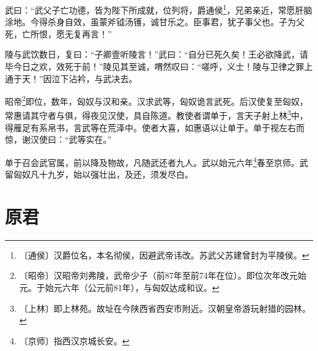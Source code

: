 \documentclass[12pt,UTF-8,openany]{ctexbook}
\begin{document}
\begin{normalsize}
    武曰：“武父子亡功德，皆为陛下所成就，位列将，爵通侯\footnote{〔通侯〕汉爵位名，本名彻侯，因避武帝讳改。苏武父苏建曾封为平陵侯。}，兄弟亲近，常愿肝脑涂地。今得杀身自效，虽蒙斧钺汤镬，诚甘乐之。臣事君，犹子事父也。子为父死，亡所恨，愿无复再言！”
    
    陵与武饮数日，复曰：“子卿壹听陵言！”武曰：“自分已死久矣！王必欲降武，请毕今日之欢，效死于前！”陵见其至诚，喟然叹曰：“嗟呼，义士！陵与卫律之罪上通于天！”因泣下沾衿，与武决去。
    
    昭帝\footnote{〔昭帝〕汉昭帝刘弗陵，武帝少子（前87年至前74年在位）。即位次年改元始元。于始元六年（公元前81年），与匈奴达成和议。}即位，数年，匈奴与汉和亲。汉求武等，匈奴诡言武死。后汉使复至匈奴，常惠请其守者与俱，得夜见汉使，具自陈道。教使者谓单于，言天子射上林\footnote{〔上林〕即上林苑。故址在今陕西省西安市附近。汉朝皇帝游玩射猎的园林。}中，得雁足有系帛书，言武等在荒泽中。使者大喜，如惠语以让单于。单于视左右而惊，谢汉使曰：“武等实在。”
    
    单于召会武官属，前以降及物故，凡随武还者九人。武以始元六年\footnote{〔京师〕指西汉京城长安。}春至京师。武留匈奴凡十九岁，始以强壮出，及还，须发尽白。
\end{normalsize}



\chapter{原君}
\end{document}
